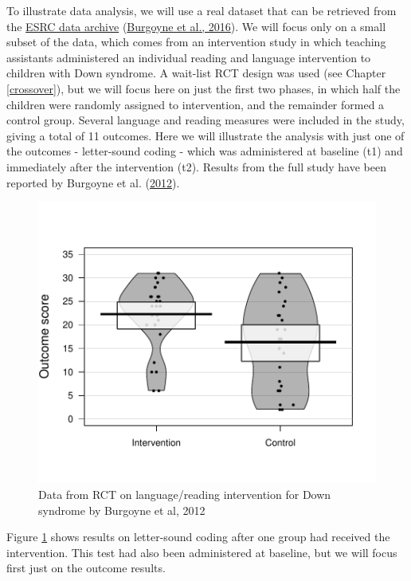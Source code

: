 \documentclass{krantz}
\begin{document}
To illustrate data analysis, we will use a real dataset that can be retrieved from the \href{https://reshare.ukdataservice.ac.uk/852291/}{ESRC data archive} (\protect\hyperlink{ref-burgoyne2016}{Burgoyne et al., 2016}). We will focus only on a small subset of the data, which comes from an intervention study in which teaching assistants administered an individual reading and language intervention to children with Down syndrome. A wait-list RCT design was used (see Chapter \ref{crossover}), but we will focus here on just the first two phases, in which half the children were randomly assigned to intervention, and the remainder formed a control group. Several language and reading measures were included in the study, giving a total of 11 outcomes. Here we will illustrate the analysis with just one of the outcomes - letter-sound coding - which was administered at baseline (t1) and immediately after the intervention (t2). Results from the full study have been reported by Burgoyne et al. (\protect\hyperlink{ref-burgoyne2012}{2012}).

\begin{center}
\begin{figure}
\includegraphics[width=0.75\linewidth]{images_bw/pirateRCT} \caption{Data from RCT on language/reading intervention for Down syndrome by Burgoyne et al, 2012}\label{fig:pirateRCT}
\end{figure}
\end{center}

Figure \ref{fig:pirateRCT} shows results on letter-sound coding after one group had received the intervention. This test had also been administered at baseline, but we will focus first just on the outcome results.
\end{document}
